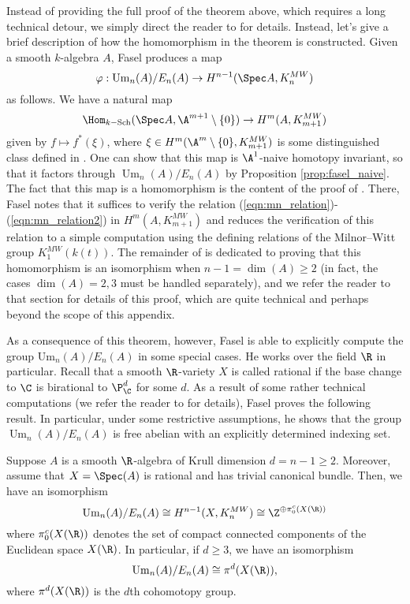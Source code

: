 Instead of providing the full proof of the theorem above, which requires a long technical detour, we simply direct the reader to \cite[Section 4]{Fasel_2010} for details. Instead, let's give a brief description of how the homomorphism in the theorem is constructed. Given a smooth $k$-algebra $A$, Fasel produces a map
\[
\varphi: \mathrm{Um}_n(A)/E_n(A) \to H^{n-1}(\Spec A,K_{n}^{MW})
\]
as follows. We have a natural map
\[
\Hom_{k\mathrm{-Sch}}(\Spec A, \A^{m+1} \setminus\{0\}) \to H^{m}(A,K_{m+1}^{MW})
\]
given by $f \mapsto f^*(\xi)$, where $\xi \in H^{m}(\A^m\setminus\{0\},K_{m+1}^{MW})$ is some distinguished class defined in \cite[Section 3]{Fasel_2010}. One can show that this map is $\A^1$-naive homotopy invariant, so that it factors through $\operatorname{Um}_n(A)/E_n(A)$ by Proposition \ref{prop:fasel_naive}. The fact that this map is a homomorphism is the content of the proof of \cite[Theorem 4.1]{Fasel_2010}. There, Fasel notes that it suffices to verify the relation (\ref{eqn:mn_relation})-(\ref{eqn:mn_relation2}) in $H^{m}(A,K_{m+1}^{MW})$ and reduces the verification of this relation to a simple computation using the defining relations of the Milnor--Witt group $K_1^{MW}(k(t))$. The remainder of \cite[Section 4]{Fasel_2010} is dedicated to proving that this homomorphism is an isomorphism when $n-1 = \dim(A) \geq 2$ (in fact, the cases $\dim(A) = 2,3$ must be handled separately), and we refer the reader to that section for details of this proof, which are quite technical and perhaps beyond the scope of this appendix.

As a consequence of this theorem, however, Fasel is able to explicitly compute the group $\mathrm{Um}_n(A)/E_n(A)$ in some special cases. He works over the field $\R$ in particular. Recall that a smooth $\R$-variety $X$ is called rational if the base change to $\C$ is birational to $\P_\C^d$ for some $d$. As a result of some rather technical computations (we refer the reader to \cite[Section 5]{Fasel_2010} for details), Fasel proves the following result. In particular, under some restrictive assumptions, he shows that the group $\operatorname{Um}_n(A)/E_n(A)$ is free abelian with an explicitly determined indexing set.

\begin{theorem}\cite[Theorem 5.7, Remark 5.8]{Fasel_2010}\label{thm:fasel_explicit_group}
    Suppose $A$ is a smooth $\R$-algebra of Krull dimension $d = n-1 \geq 2$. Moreover, assume that $X = \Spec(A)$ is rational and has trivial canonical bundle. Then, we have an isomorphism
    \[
    \operatorname{Um}_n(A)/E_n(A) \cong H^{n-1}(X, K_{n}^{MW}) \cong \Z^{\oplus \pi_0^c(X(\R))}
    \]
    where $\pi_0^c(X(\R))$ denotes the set of compact connected components of the Euclidean space $X(\R)$. In particular, if $d \geq 3$, we have an isomorphism
    \[
    \operatorname{Um}_n(A)/E_n(A) \cong \pi^d(X(\R)),
    \]
    where $\pi^d(X(\R))$ is the $d$th cohomotopy group.
\end{theorem}

